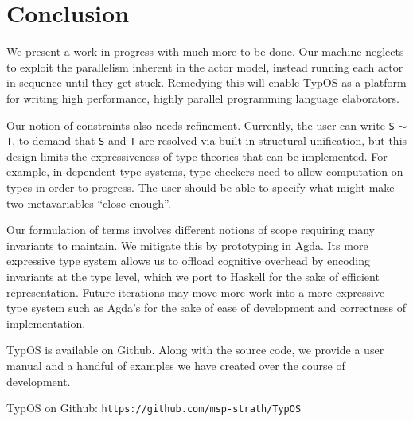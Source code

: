 \documentclass{easychair}
\newcommand{\TypOS}{TypOS\xspace}
\newcommand{\tm}[1]{\texttt{#1}\;}
\newcommand{\ty}[1]{\tm{#1}}
\newcommand{\constrain}[2]{#1 $\sim$ #2}
\begin{document}

\section*{Conclusion} %
We present a work in progress with much more to be done. Our machine neglects to exploit the parallelism inherent in the actor model, instead running each actor in sequence until they get stuck. Remedying this will enable \TypOS as a platform for writing high performance, highly parallel programming language elaborators.

Our notion of constraints also needs refinement. Currently, the user can write \constrain{\ty{S}\!}{\ty{T}}, to demand that \ty{S} and \ty{T} are resolved via built-in structural unification, but this design limits the expressiveness of type theories that can be implemented. For example, in dependent type systems, type checkers need to allow computation on types in order to progress. The user should be able to specify what might make two metavariables ``close enough''.

Our formulation of terms involves different notions of scope requiring many invariants to maintain.
We mitigate this by prototyping in Agda. Its more expressive type system allows us to offload cognitive overhead by encoding invariants at the type level, which we port to Haskell for the sake of efficient representation. Future iterations may move more work into a more expressive type system such as Agda's for the sake of ease of development and correctness of implementation.

\TypOS is available on Github\cite{typos}. Along with the source code, we provide a user manual and a handful of examples we have created over the course of development.


\begin{thebibliography}{1}
 \TypOS on Github: \texttt{https://github.com/msp-strath/TypOS}
\end{thebibliography}
\end{document}
